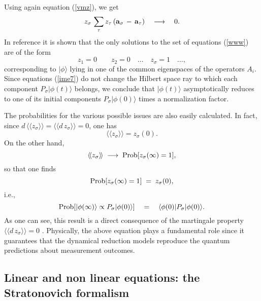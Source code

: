 \documentclass[10pt,a4paper]{article}
\newcommand{\llangle}{\langle\!\langle}
\newcommand{\rrangle}{\rangle\!\rangle}
\begin{document}
Using again equation (\ref{vmz}), we get
\begin{equation} \label{soe}
z_{\sigma}\, \sum_{\tau} z_{\tau}\, ({\bf a}_{\sigma} \, - \, {\bf
a}_{\tau}) \quad \longrightarrow \quad 0.
\end{equation}
In reference \cite{csl} it is shown that the only solutions to the
set of equations (\ref{www}) are of the form
\[
z_{1} = 0 \qquad z_{2} = 0 \quad \ldots \quad z_{\sigma} = 1 \quad
\ldots,
\]
corresponding to $|\phi\rangle$ lying in one of the common
eigenspaces of the operators $A_{i}$.  Since equations
(\ref{ime7}) do not change  the Hilbert space ray to which each
component $P_{\sigma}|\phi(t)\rangle$ belongs, we conclude that
$|\phi(t)\rangle$ asymptotically reduces to one of its initial
components $P_{\sigma}|\phi(0)\rangle$ times a normalization
factor.

The probabilities for the various possible issues are also easily
calculated. In fact, since $d\, \llangle z_{\sigma} \rrangle  =
\llangle d\, z_{\sigma} \rrangle = 0$, one has
\begin{equation}
\llangle z_{\sigma} \rrangle = z_{\sigma}(0).
\end{equation}
On the other hand,
\begin{equation}
\llangle z_{\sigma} \rrangle \; \longrightarrow \;
\makebox{Prob}[z_{\sigma}(\infty) = 1],
\end{equation}
so that one finds
\begin{equation}
{\makebox{Prob}}[z_{\sigma}(\infty) = 1] \; = \; z_{\sigma}(0),
\end{equation}
i.e.,
\begin{equation} \label{ixfgjb}
\makebox{Prob}[|\phi(\infty)\rangle \propto
P_{\sigma}|\phi(0)\rangle] \quad = \quad \langle\phi(0)|P_{\sigma}
|\phi(0)\rangle.
\end{equation}
As one can see, this result is a direct consequence of the
martingale property $\llangle d\, z_{\sigma} \rrangle  = 0$
\cite{pea3,pea4,csl0}. Physically, the above equation plays a
fundamental role since it guarantees that the dynamical reduction
models reproduce the quantum predictions about measurement
outcomes.


\subsection{Linear and non linear equations: the Stratonovich
formalism} \label{sec64}
\end{document}
